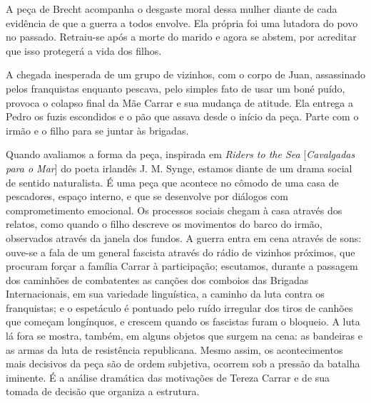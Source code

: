 A peça de Brecht acompanha o desgaste moral dessa mulher diante de cada
evidência de que a guerra a todos envolve. Ela própria foi uma lutadora
do povo no passado. Retraiu-se após a morte do marido e agora se abstem,
por acreditar que isso protegerá a vida dos filhos.

A chegada inesperada de um grupo de vizinhos, com o corpo de Juan,
assassinado pelos franquistas enquanto pescava, pelo simples fato de
usar um boné puído, provoca o colapso final da Mãe Carrar e sua mudança
de atitude. Ela entrega a Pedro os fuzis escondidos e o pão que assava
desde o início da peça. Parte com o irmão e o filho para se juntar às
brigadas.

Quando avaliamos a forma da peça, inspirada em {\it Riders to the Sea}
{[}{\it Cavalgadas para o Mar}{]} do poeta irlandês J. M. Synge, estamos
diante de um drama social de sentido naturalista. É uma peça que
acontece no cômodo de uma casa de pescadores, espaço interno, e que se
desenvolve por diálogos com comprometimento emocional. Os processos
sociais chegam à casa através dos relatos, como quando o filho descreve
os movimentos do barco do irmão, observados através da janela dos
fundos. A guerra entra em cena através de sons: ouve-se a fala de um
general fascista através do rádio de vizinhos próximos, que procuram
forçar a família Carrar à participação; escutamos, durante a passagem
dos caminhões de combatentes as canções dos comboios das Brigadas
Internacionais, em sua variedade linguística, a caminho da luta contra
os franquistas; e o espetáculo é pontuado pelo ruído irregular dos tiros
de canhões que começam longínquos, e crescem quando os fascistas furam o
bloqueio. A luta lá fora se mostra, também, em alguns objetos que surgem
na cena: as bandeiras e as armas da luta de resistência republicana.
Mesmo assim, os acontecimentos mais decisivos da peça são de ordem
subjetiva, ocorrem sob a pressão da batalha iminente. É a análise
dramática das motivações de Tereza Carrar e de sua tomada de decisão que
organiza a estrutura.

